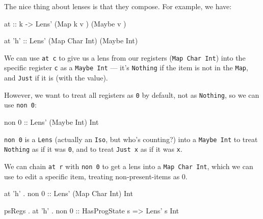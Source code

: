 \documentclass[]{article}
\newenvironment{Shaded}{}{}
\newcommand{\CharTok}[1]{\textcolor[rgb]{0.25,0.44,0.63}{#1}}
\newcommand{\DataTypeTok}[1]{\textcolor[rgb]{0.56,0.13,0.00}{#1}}
\newcommand{\DecValTok}[1]{\textcolor[rgb]{0.25,0.63,0.44}{#1}}
\newcommand{\FunctionTok}[1]{\textcolor[rgb]{0.02,0.16,0.49}{#1}}
\newcommand{\NormalTok}[1]{#1}
\newcommand{\OtherTok}[1]{\textcolor[rgb]{0.00,0.44,0.13}{#1}}
\begin{document}
The nice thing about lenses is that they compose. For example, we have:

\begin{Shaded}
\begin{Highlighting}[]
\OtherTok{at ::}\NormalTok{ k }\OtherTok{->} \DataTypeTok{Lens'}\NormalTok{ (}\DataTypeTok{Map}\NormalTok{ k    v  ) (}\DataTypeTok{Maybe}\NormalTok{ v  )}

\NormalTok{at }\CharTok{'h'}\OtherTok{  ::} \DataTypeTok{Lens'}\NormalTok{ (}\DataTypeTok{Map} \DataTypeTok{Char} \DataTypeTok{Int}\NormalTok{) (}\DataTypeTok{Maybe} \DataTypeTok{Int}\NormalTok{)}
\end{Highlighting}
\end{Shaded}

We can use \texttt{at\ \textquotesingle{}c\textquotesingle{}} to give us a lens
from our registers (\texttt{Map\ Char\ Int}) into the specific register
\texttt{\textquotesingle{}c\textquotesingle{}} as a \texttt{Maybe\ Int} --- it's
\texttt{Nothing} if the item is not in the \texttt{Map}, and \texttt{Just} if it
is (with the value).

However, we want to treat all registers as \texttt{0} by default, not as
\texttt{Nothing}, so we can use \texttt{non\ 0}:

\begin{Shaded}
\begin{Highlighting}[]
\NormalTok{non }\DecValTok{0}\OtherTok{ ::} \DataTypeTok{Lens'}\NormalTok{ (}\DataTypeTok{Maybe} \DataTypeTok{Int}\NormalTok{) }\DataTypeTok{Int}
\end{Highlighting}
\end{Shaded}

\texttt{non\ 0} is a \texttt{Lens} (actually an \texttt{Iso}, but who's
counting?) into a \texttt{Maybe\ Int} to treat \texttt{Nothing} as if it was
\texttt{0}, and to treat \texttt{Just\ x} as if it was \texttt{x}.

We can chain \texttt{at\ r} with \texttt{non\ 0} to get a lens into a
\texttt{Map\ Char\ Int}, which we can use to edit a specific item, treating
non-present-items as 0.

\begin{Shaded}
\begin{Highlighting}[]
\NormalTok{         at }\CharTok{'h'} \FunctionTok{.}\NormalTok{ non }\DecValTok{0}\OtherTok{ ::} \DataTypeTok{Lens'}\NormalTok{ (}\DataTypeTok{Map} \DataTypeTok{Char} \DataTypeTok{Int}\NormalTok{) }\DataTypeTok{Int}

\NormalTok{psRegs }\FunctionTok{.}\NormalTok{ at }\CharTok{'h'} \FunctionTok{.}\NormalTok{ non }\DecValTok{0}\OtherTok{ ::} \DataTypeTok{HasProgState}\NormalTok{ s }\OtherTok{=>} \DataTypeTok{Lens'}\NormalTok{ s }\DataTypeTok{Int}
\end{Highlighting}
\end{Shaded}
\end{document}
